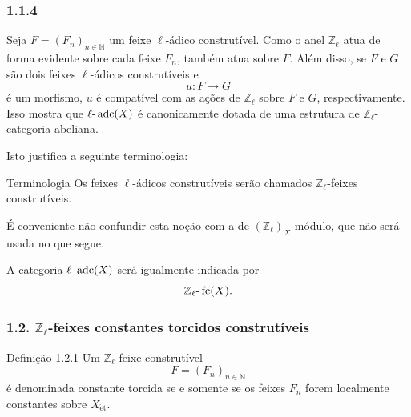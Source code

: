 \subsubsection*{1.1.4}
Seja \(F=(F_n)_{n\in\mathbb N}\) um feixe \(\ell\)-ádico construtível. Como o anel \(\mathbb Z_\ell\) atua de forma evidente sobre cada feixe \(F_n\), também atua sobre \(F\). Além disso, se \(F\) e \(G\) são dois feixes \(\ell\)-ádicos construtíveis e
\[
u:F\longrightarrow G
\]
é um morfismo, \(u\) é compatível com as ações de \(\mathbb Z_\ell\) sobre \(F\) e \(G\), respectivamente. Isso mostra que \(\ell\text{-}\operatorname{adc}(X)\) é canonicamente dotada de uma estrutura de \(\mathbb Z_\ell\)-categoria abeliana.

Isto justifica a seguinte terminologia:

\begin{statement}{Terminologia}
Os feixes \(\ell\)-ádicos construtíveis serão chamados \(\mathbb Z_\ell\)-feixes construtíveis.
\end{statement}

É conveniente não confundir esta noção com a de \((\mathbb Z_\ell)_X\)-módulo, que não será usada no que segue.

A categoria \(\ell\text{-}\operatorname{adc}(X)\) será igualmente indicada por
\[
\mathbb Z_\ell\text{-}\operatorname{fc}(X).
\]

\subsubsection*{1.2. \(\mathbb Z_\ell\)-feixes constantes torcidos construtíveis}

\begin{statement}{Definição 1.2.1}
Um \(\mathbb Z_\ell\)-feixe construtível
\[
F=(F_n)_{n\in\mathbb N}
\]
é denominada constante torcida se e somente se os feixes \(F_n\) forem localmente constantes sobre \(X_{\mathrm{\acute et}}\).
\end{statement}
